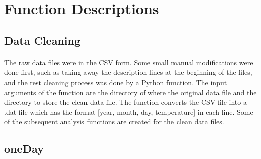 \documentclass[a4paper,12pt]{article}
\begin{document}
\section{Function Descriptions}

\subsection{Data Cleaning}
\paragraph{}
The raw data files were in the CSV form. Some small manual modifications were done first, such as taking away the description lines at the beginning of the files, and the rest cleaning process was done by a Python function. The input arguments of the function are the directory of where the original data file and the directory to store the clean data file. The function converts the CSV file into a .dat file which has the format [year, month, day, temperature] in each line. Some of the subsequent analysis functions are created for the clean data files.


\subsection{oneDay}
\end{document}
